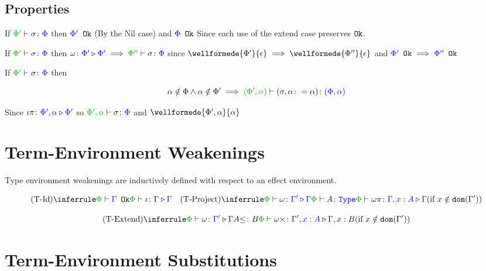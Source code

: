 \documentclass{report}
\begin{document}
    \subsection{Properties}
        
        \begin{property}[Wellformedness]\label{EffectSubsPropertyOne}
            If $\typerelation{\P'}{\si}{\P}$ then ${\color{blue} \Phi'} \texttt{ Ok}$ (By  the 
            Nil case) and ${\color{blue} \Phi} \texttt{ Ok}$ Since each use of the extend case preserves $\texttt{Ok}$.
        \end{property}

        \begin{property}[Weakening]\label{EffectSubsPropertyTwo}
            If $\typerelation{\P'}{\si}{\P}$ then $\wrelw{\P'}{\P'} \implies \typerelation{\P''}{\si}{\P}$ since $\wellformede{\P'}{\e}\implies \wellformede{\P''}{\e}$ and ${\color{blue} \Phi'} \texttt{ Ok}\implies {\color{blue} \Phi''} \texttt{ Ok}$
        \end{property}

        \begin{property}[Extension]\label{EffectSubsPropertyThree}
            If $\typerelation{\P'}{\si}{\P}$ then
        
            \begin{equation}
                \a\notin\P\wedge\a\notin\P' \implies \typerelation{(\P', \a)}{(\si, \a\setto\a)}{(\P,\a)}
            \end{equation}

            Since $\iota\pi \colon {\color{blue}\Phi',\alpha} \triangleright {\color {blue} \Phi'}$ so $\typerelation{\P',\a}{\si}{\P}$ and $\wellformede{\P',\a}{\a}$        
        \end{property}

\section{Term-Environment Weakenings}
Type environment weakenings are inductively defined with respect to an effect environment.


\[
    \ntreeruleI{\tid}{\wellformedok{\P}{\G}}{\pewrel{\i}{\G}{\G}}
    \quad  
    \condtreeruleII{\tproject}{\pewrel{\w}{\G'}{\G}}{\typerelation{\P}{A}{\type}}{\pewrel{\w \pi}{\G, x: A}{\G}}{x \notin \dom{\G'}}
\]

\[
    \condtreeruleII{\textend}{\pewrel{\w}{\G'}{\G}}{ A \subtype B}{\pewrel{\w \x}{\G', x: A}{\G, x: B}}{x \notin \dom{\G'}}
\]

\section{Term-Environment Substitutions}
\end{document}
